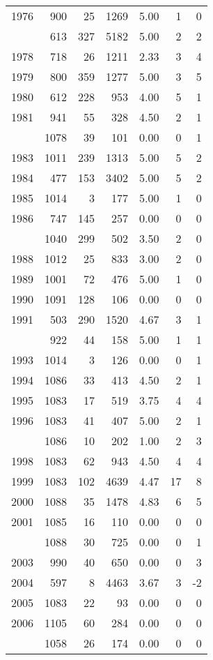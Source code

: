 \documentclass[
]{article}
\begin{document}
\begin{table}
\begin{tabular}[t]{lrrrrrr}
1976 & 900 & 25 & 1269 & 5.00 & 1 & 0\\
\addlinespace
1977 & 613 & 327 & 5182 & 5.00 & 2 & 2\\
1978 & 718 & 26 & 1211 & 2.33 & 3 & 4\\
1979 & 800 & 359 & 1277 & 5.00 & 3 & 5\\
1980 & 612 & 228 & 953 & 4.00 & 5 & 1\\
1981 & 941 & 55 & 328 & 4.50 & 2 & 1\\
\addlinespace
1982 & 1078 & 39 & 101 & 0.00 & 0 & 1\\
1983 & 1011 & 239 & 1313 & 5.00 & 5 & 2\\
1984 & 477 & 153 & 3402 & 5.00 & 5 & 2\\
1985 & 1014 & 3 & 177 & 5.00 & 1 & 0\\
1986 & 747 & 145 & 257 & 0.00 & 0 & 0\\
\addlinespace
1987 & 1040 & 299 & 502 & 3.50 & 2 & 0\\
1988 & 1012 & 25 & 833 & 3.00 & 2 & 0\\
1989 & 1001 & 72 & 476 & 5.00 & 1 & 0\\
1990 & 1091 & 128 & 106 & 0.00 & 0 & 0\\
1991 & 503 & 290 & 1520 & 4.67 & 3 & 1\\
\addlinespace
1992 & 922 & 44 & 158 & 5.00 & 1 & 1\\
1993 & 1014 & 3 & 126 & 0.00 & 0 & 1\\
1994 & 1086 & 33 & 413 & 4.50 & 2 & 1\\
1995 & 1083 & 17 & 519 & 3.75 & 4 & 4\\
1996 & 1083 & 41 & 407 & 5.00 & 2 & 1\\
\addlinespace
1997 & 1086 & 10 & 202 & 1.00 & 2 & 3\\
1998 & 1083 & 62 & 943 & 4.50 & 4 & 4\\
1999 & 1083 & 102 & 4639 & 4.47 & 17 & 8\\
2000 & 1088 & 35 & 1478 & 4.83 & 6 & 5\\
2001 & 1085 & 16 & 110 & 0.00 & 0 & 0\\
\addlinespace
2002 & 1088 & 30 & 725 & 0.00 & 0 & 1\\
2003 & 990 & 40 & 650 & 0.00 & 0 & 3\\
2004 & 597 & 8 & 4463 & 3.67 & 3 & -2\\
2005 & 1083 & 22 & 93 & 0.00 & 0 & 0\\
2006 & 1105 & 60 & 284 & 0.00 & 0 & 0\\
\addlinespace
2007 & 1058 & 26 & 174 & 0.00 & 0 & 0\\

\end{tabular}
\end{table}
\end{document}
